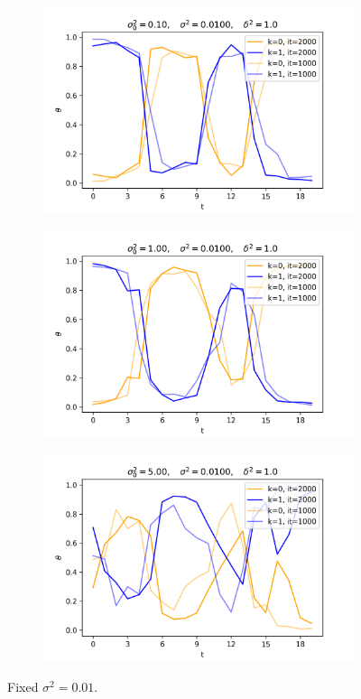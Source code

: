 \documentclass[12pt]{article}
\begin{document}
\begin{figure}[H]
  \begin{subfigure}[b]{0.33\textwidth}
    \includegraphics[width=\linewidth]{init_1E-01|basic_1E-02|prop_1E+00|it_2000|autoreg_True}
  \end{subfigure}%
  \begin{subfigure}[b]{0.33\textwidth}
    \includegraphics[width=\linewidth]{init_1E+00|basic_1E-02|prop_1E+00|it_2000|autoreg_True}
  \end{subfigure}%
  \begin{subfigure}[b]{0.33\textwidth}
    \includegraphics[width=\linewidth]{init_5E+00|basic_1E-02|prop_1E+00|it_2000|autoreg_True}
  \end{subfigure}
  \caption{Fixed $\sigma^2=0.01$.}
\end{figure}
\end{document}
